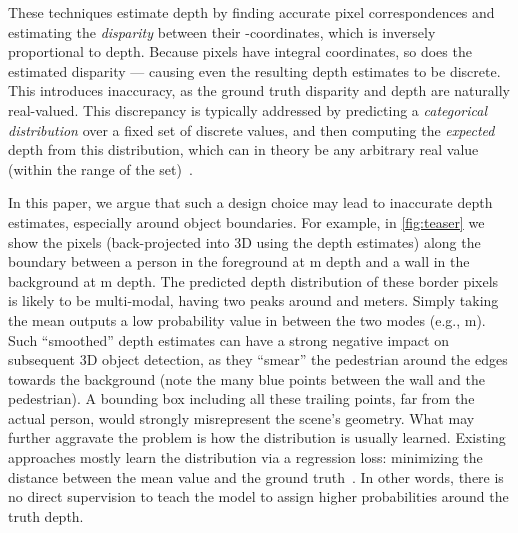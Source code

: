 \documentclass{article}
\newcommand{\eg}{e.g.\xspace}
\begin{document}
These techniques estimate depth by finding accurate pixel correspondences and estimating the \emph{disparity} between their -coordinates, which is inversely proportional to depth.
Because pixels have integral coordinates, so does the estimated disparity --- causing even the resulting depth estimates to be discrete. 
This introduces inaccuracy, as the ground truth disparity and depth are naturally real-valued. This discrepancy is typically addressed by predicting a \emph{categorical distribution} over a fixed set of discrete values, and then computing the \emph{expected} depth from this distribution, which can in theory be any arbitrary real value (within the range of the set)~\cite{wang2018anytime,chang2018pyramid,zhang2019ga,kendall2017end,you2019pseudo}.


In this paper, we argue that such a design choice may lead to inaccurate depth estimates, especially around object boundaries.
For example, in \autoref{fig:teaser} we show the pixels (back-projected into 3D using the depth estimates) along the boundary between a person in the foreground at m depth and a wall in the background at m depth. The predicted depth distribution of these border pixels is likely to be multi-modal, having two peaks around  and  meters. Simply taking the mean outputs a low probability value in between the two modes (\eg, m). 
Such ``smoothed'' depth estimates can have a strong negative impact on subsequent 3D object detection, as they  ``smear'' the pedestrian around the edges towards the background (note the many blue points between the wall and the pedestrian). A bounding box including all these trailing points, far from the actual person, would strongly misrepresent the scene's geometry. What may further aggravate the problem is how the distribution is usually learned. 
Existing approaches mostly learn the distribution via a regression loss: minimizing the distance between the mean value and the ground truth~\cite{kendall2017end,you2019pseudo}. 
In other words, there is no direct supervision to teach the model to assign higher probabilities around the truth depth.
\end{document}

